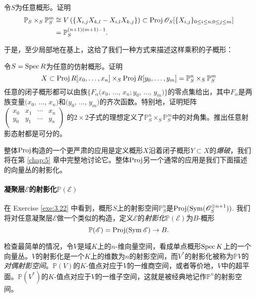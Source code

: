 \begin{exe}\label{exe:3.23}
令$S$为任意概形。证明
\begin{align*}
\mathbb P_S\times_S \mathbb P_S^m &\cong V\left(\{X_{i,j}X_{k,l}-X_{i,l}X_{k,j}\}\right)\subset \operatorname{Proj} \mathscr{O}_S[\{X_{i,j}\}_{0\leq i\leq n;0\leq j\leq m}]\\
& = \mathbb P_S^{(n+1)(m+1)-1}.
\end{align*}
\end{exe}

于是，至少局部地在基上，这给了我们一种方式来描述这样乘积的子概形：

\begin{exe}\label{exe:3.24}
令$S=\operatorname{Spec} R$为任意的仿射概形。证明
\[
	X\subset \operatorname{Proj} R[x_0,\dots,x_n]\times_S \operatorname{Proj} R[y_0,\dots,y_m]=\mathbb P^n_S\times_S\mathbb P^m_S
\]
任意的闭子概形都可以由族$\{F_\alpha(x_0$, $\dots$, $x_n;y_0$, $\dots$, $y_m)\}$的零点集给出，其中$F_{\alpha}$是两族变量$(x_0$, $\dots$, $x_n)$和$(y_0$, $\dots$, $y_m)$的齐次函数。特别地，证明矩阵
$
\begin{pmatrix}
x_0&x_1&\cdots &x_n\\
y_0&y_1&\cdots &y_n\\
\end{pmatrix}
$
的$2\times 2$子式的理想定义了$\mathbb P^n_S\times_S\mathbb P^m_S$中的对角集。推出任意射影态射都是可分的。
\end{exe}

整体$\operatorname{Proj}$构造的一个更严肃的应用是定义概形$X$沿着闭子概形$Y\subset X$的\textit{爆破}，我们将在第 \ref{chap:5} 章中完整地讨论它。整体$\operatorname{Proj}$另一个通常的应用是我们下面描述的向量丛的射影化。

\paragraph*{凝聚层\texorpdfstring{$\mathscr E$}{E}的射影化\texorpdfstring{$\mathbb P(\mathscr E)$}{P(E)}}
在 Exercise \ref{exe:3.22} 中看到，概形$S$上的射影空间$\mathbb P_S^n$是$\operatorname{Proj}(\operatorname{Sym}(\mathscr{O}_S^{\oplus n+1}))$. 我们将对任意凝聚层$\mathscr E$做一个类似的构造，定义$\mathscr E$的\textit{射影化}$\mathbb P(\mathscr E)$为$B$-概形
\[
	\mathbb P(\mathscr E)=\operatorname{Proj}(\operatorname{Sym} \mathscr E)\to B.
\]

检查最简单的情况，令$V$是域$K$上的$n$-维向量空间，看成单点概形$\operatorname{Spec} K$上的一个向量丛。$V$的射影化是一个$K$上的维数为$n$的射影空间，而$V^*$的射影化被称为$\mathbb PV$的\textit{对偶射影空间}。$\mathbb P(V)$的$K$-值点对应于$V$的一维商空间，或者等价地，$V$中的超平面。$\mathbb P(V^*)$的$K$-值点对应于$V$的一维子空间，这就是被经典地记作$\mathbb P^n$的射影空间。

